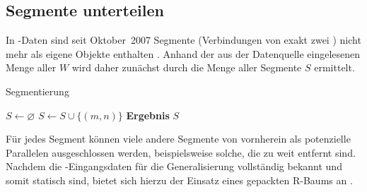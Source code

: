 \documentclass[../main/thesis.tex]{subfiles}
\begin{document}



\subsection{Segmente unterteilen}

In \osm-Daten sind seit Oktober~2007 Segmente (Verbindungen von exakt zwei ) nicht mehr als eigene Objekte enthalten . Anhand der aus der Datenquelle eingelesenen Menge aller  $W$ wird daher zunächst durch  die Menge aller Segmente $S$ ermittelt.

\begin{algorithm}[H]
\caption{Segmentierung}\label{alg:Segmentierung}
\begin{algorithmic}
	\State $S \gets \varnothing$
			\State $S \gets S \cup \{(m,n)\}$
		\EndFor
	\EndFor
	\State \textbf{Ergebnis} $S$
\EndFunction
\end{algorithmic}
\end{algorithm}

Für jedes Segment können viele andere Segmente von vornherein als potenzielle Parallelen ausgeschlossen werden, beispielsweise solche, die zu weit entfernt sind. Nachdem die \osm-Eingangsdaten für die Generalisierung vollständig bekannt und somit statisch sind, bietet sich hierzu der Einsatz eines gepackten R-Baums an .


\end{document}
